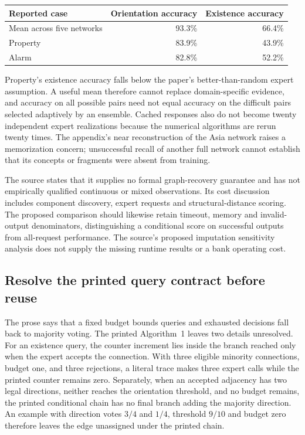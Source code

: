 \begin{center}
\begin{tabular}{lrr}
\hline
Reported case & Orientation accuracy & Existence accuracy\\
\hline
Mean across five networks & 93.3\% & 66.4\%\\
Property & 83.9\% & 43.9\%\\
Alarm & 82.8\% & 52.2\%\\
\hline
\end{tabular}
\end{center}
Property's existence accuracy falls below the paper's better-than-random expert
assumption. A useful mean therefore cannot replace domain-specific evidence,
and accuracy on all possible pairs need not equal accuracy on the difficult
pairs selected adaptively by an ensemble. Cached responses also do not become
twenty independent expert realizations because the numerical algorithms are
rerun twenty times. The appendix's near reconstruction of the Asia network
raises a memorization concern; unsuccessful recall of another full network
cannot establish that its concepts or fragments were absent from training.
\citep{exec20_expert_averaging}

The source states that it supplies no formal graph-recovery guarantee and has
not empirically qualified continuous or mixed observations. Its cost discussion
includes component discovery, expert requests and structural-distance scoring.
The proposed comparison should likewise retain timeout, memory and invalid-
output denominators, distinguishing a conditional score on successful outputs
from all-request performance. The source's proposed imputation sensitivity
analysis does not supply the missing runtime results or a bank operating cost.

\subsection{Resolve the printed query contract before reuse}
\label{exec20:expert-budget}

The prose says that a fixed budget bounds queries and exhausted decisions fall
back to majority voting. The printed Algorithm~1 leaves two details unresolved.
For an existence query, the counter increment lies inside the branch reached
only when the expert accepts the connection. With three eligible minority
connections, budget one, and three rejections, a literal trace makes three
expert calls while the printed counter remains zero. Separately, when an
accepted adjacency has two legal directions, neither reaches the orientation
threshold, and no budget remains, the printed conditional chain has no final
branch adding the majority direction. An example with direction votes
$3/4$ and $1/4$, threshold $9/10$ and budget zero therefore leaves the edge
unassigned under the printed chain. \citep{exec20_expert_averaging_reference}

